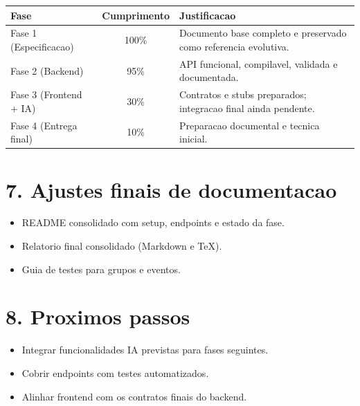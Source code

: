 \documentclass[11pt,a4paper]{article}
\begin{document}
\begin{tabularx}{\textwidth}{|l|c|X|}
\hline
\textbf{Fase} & \textbf{Cumprimento} & \textbf{Justificacao} \\
\hline
Fase 1 (Especificacao) & 100\% & Documento base completo e preservado como referencia evolutiva. \\
\hline
Fase 2 (Backend) & 95\% & API funcional, compilavel, validada e documentada. \\
\hline
Fase 3 (Frontend + IA) & 30\% & Contratos e stubs preparados; integracao final ainda pendente. \\
\hline
Fase 4 (Entrega final) & 10\% & Preparacao documental e tecnica inicial. \\
\hline
\end{tabularx}

\section*{7. Ajustes finais de documentacao}

\begin{itemize}
  \item README consolidado com setup, endpoints e estado da fase.
  \item Relatorio final consolidado (Markdown e TeX).
  \item Guia de testes para grupos e eventos.
\end{itemize}

\section*{8. Proximos passos}

\begin{itemize}
  \item Integrar funcionalidades IA previstas para fases seguintes.
  \item Cobrir endpoints com testes automatizados.
  \item Alinhar frontend com os contratos finais do backend.
\end{itemize}
\end{document}
